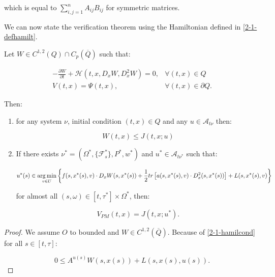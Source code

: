which is equal to $\sum_{i,j=1}^n A_{ij}B_{ij}$ for symmetric matrices.

We can now state the verification theorem using the Hamiltonian defined in \ref{2-1-defhamilt}.

\begin{theorem}
    Let $W\in C^{1,2}(Q)\cap C_p(\overline{Q})$ such that:

    \begin{align}\label{2-1-hamilcond}
        -\frac{\partial W}{\partial t} + \mathcal{H}(t,x,D_xW,D_x^2W) = 0, & \forall(t,x)\in Q \\
        V(t,x) = \Psi(t,x), & \forall(t,x)\in\partial Q.
    \end{align}

    Then:

    \begin{enumerate}
        \item for any system $\nu$, initial condition $(t,x)\in Q$ and any $u\in \mathcal{A}_{t\nu}$ then:
        
        \begin{equation}
            W(t,x) \leq J(t,x;u)
        \end{equation}

        \item If there exists $\nu^{\ast}=(\Omega^{\ast},\{\mathcal{F}_s^{\ast}\},P^{\ast},w^{\ast})$ and $u^{\ast}\in\mathcal{A}_{t\nu^{\ast}}$ such that:
        
        \begin{equation}
            u^{\ast}(s) \in \operatorname*{arg\,min}_{v\in U}\left\{f(s,x^{\ast}(s),v)\cdot D_xW(s,x^{\ast}(s)) + \frac{1}{2}tr\left[a(s,x^{\ast}(s),v)\cdot D_x^2(s,x^{\ast}(s))\right] + L(s,x^{\ast}(s),v)\right\}
        \end{equation}

        for almost all $(s,\omega)\in[t,\tau^{\ast}]\times\Omega^{\ast}$, then:

        \begin{equation}
            V_{PM}(t,x) = J(t,x;u^{\ast}).
        \end{equation}
    \end{enumerate}

    \begin{proof}
        We assume $O$ to bounded and $W\in C^{1,2}(\overline{Q})$. Because of \ref{2-1-hamilcond} for all $s\in[t,\tau]$:

        \begin{equation}\label{2-1-proofver-keyeq}
            0\leq A^{u(s)}W(s,x(s)) + L(s,x(s),u(s)).
        \end{equation}


\end{proof}
\end{theorem}
